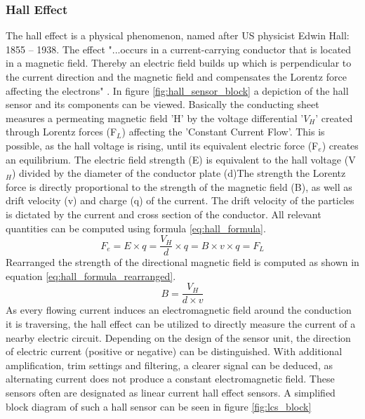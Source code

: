 \subsubsection{Hall Effect}
The hall effect is a physical phenomenon, named after US physicist Edwin Hall: 1855 – 1938. The effect "...occurs in a current-carrying conductor
that is located in a magnetic field. Thereby an electric field builds up which is perpendicular to the current direction and the magnetic field and compensates the Lorentz force affecting the electrons" \cite{Hacker2020_Hall}.
In figure \ref{fig:hall_sensor_block} a depiction of the hall sensor and its components can be viewed. Basically the conducting sheet measures a permeating magnetic field 'H' by the voltage differential '$V_H$' created through Lorentz forces (F$_L$) affecting the 'Constant Current Flow'. This is possible, as the hall voltage is rising, until its equivalent electric force (F$_e$) creates an equilibrium. The electric field strength (E) is equivalent to the hall voltage (V$_H$) divided by the diameter of the conductor plate (d)The strength the Lorentz force is directly proportional to the strength of the magnetic field (B), as well as drift velocity (v) and charge (q) of the current. The drift velocity of the particles is dictated by the current and cross section of the conductor. All relevant quantities can be computed using formula \ref{eq:hall_formula}.
\begin{equation}
	F_e = E \times q = \frac{V_H}{d} \times q =  B \times v \times q = F_L
	\label{eq:hall_formula}
\end{equation}
Rearranged the strength of the directional magnetic field is computed as shown in equation \ref{eq:hall_formula_rearranged}.
\begin{equation}
	B = \dfrac{V_H}{d \times v}
	\label{eq:hall_formula_rearranged}
\end{equation}
As every flowing current induces an electromagnetic field around the conduction it is traversing, the hall effect can be utilized to directly measure the current of a nearby electric circuit. Depending on the design of the sensor unit, the direction of electric current (positive or negative) can be distinguished. With additional amplification, trim settings and filtering, a clearer signal can be deduced, as alternating current does not produce a constant electromagnetic field. These sensors often are designated as linear current hall effect sensors. A simplified block diagram of such a hall sensor can be seen in figure \ref{fig:lcs_block}

